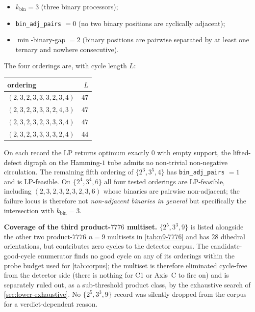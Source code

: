 \documentclass[11pt,a4paper]{article}
\theoremstyle{plain}
\theoremstyle{definition}
\begin{document}
\begin{itemize}[leftmargin=*]
\item $k_{\mathrm{bin}} = 3$ (three binary processors);
\item \texttt{bin\_adj\_pairs} $= 0$ (no two binary positions are
      cyclically adjacent);
\item $\min$-binary-gap $= 2$ (binary positions are pairwise
      separated by at least one ternary and nowhere consecutive).
\end{itemize}

\noindent The four orderings are, with cycle length $L$:

\begin{center}
\begin{tabular}{l r}
\toprule
ordering & $L$\\\midrule
$(2, 3, 2, 3, 3, 3, 2, 3, 4)$ & $47$\\
$(2, 3, 2, 3, 3, 3, 2, 4, 3)$ & $47$\\
$(2, 3, 2, 3, 2, 3, 3, 3, 4)$ & $47$\\
$(2, 3, 2, 3, 3, 3, 3, 2, 4)$ & $44$\\
\bottomrule
\end{tabular}
\end{center}

\noindent On each record the LP returns optimum exactly $0$ with
empty support, the lifted-defect digraph on the Hamming-$1$
tube admits no non-trivial non-negative circulation.  The remaining
fifth ordering of $\{2^3, 3^5, 4\}$ has \texttt{bin\_adj\_pairs} $= 1$
and is LP-feasible.  On $\{2^4, 3^4, 6\}$ all four tested
orderings are LP-feasible, including $(2, 3, 2, 3, 2, 3, 2, 3, 6)$
whose binaries are pairwise non-adjacent; the failure locus is
therefore not \emph{non-adjacent binaries in general} but
specifically the intersection with $k_{\mathrm{bin}} = 3$.

\textbf{Coverage of the third product-$7776$ multiset.}
$\{2^5, 3^3, 9\}$ is listed alongside the other two
product-$7776$ $n = 9$ multisets in \cref{tab:n9-7776} and has
$28$ dihedral orientations, but contributes zero cycles to the
detector corpus.  The candidate-good-cycle enumerator finds no
good cycle on any of its orderings within the probe budget used
for \cref{tab:corpus}; the multiset is therefore eliminated
cycle-free from the detector side (there is nothing for C1 or
Axis~C to fire on) and is separately ruled out, as a
sub-threshold product class, by the exhaustive search of
\cref{sec:lower-exhaustive}.  No $\{2^5, 3^3, 9\}$ record was
silently dropped from the corpus for a verdict-dependent reason.
\end{document}
